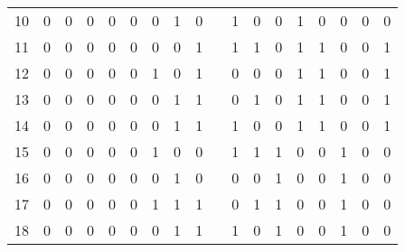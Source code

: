 \begin{table}[H]
\begin{tabular}{|c|c|c|c|c|c|c|c|c|c|c|c|c|c|c|c|c|c|}
		\cline{1-9}\cline{11-18}    10    & 0     & 0     & 0     & 0     & 0     & 0     & 1     & 0     &       & 1     & 0     & 0     & 1     & 0     & 0     & 0     & 0 \bigstrut\\
		\cline{1-9}\cline{11-18}    11    & 0     & 0     & 0     & 0     & 0     & 0     & 0     & 1     &       & 1     & 1     & 0     & 1     & 1     & 0     & 0     & 1 \bigstrut\\
		\cline{1-9}\cline{11-18}    12    & 0     & 0     & 0     & 0     & 0     & 1     & 0     & 1     &       & 0     & 0     & 0     & 1     & 1     & 0     & 0     & 1 \bigstrut\\
		\cline{1-9}\cline{11-18}    13    & 0     & 0     & 0     & 0     & 0     & 0     & 1     & 1     &       & 0     & 1     & 0     & 1     & 1     & 0     & 0     & 1 \bigstrut\\
		\cline{1-9}\cline{11-18}    14    & 0     & 0     & 0     & 0     & 0     & 0     & 1     & 1     &       & 1     & 0     & 0     & 1     & 1     & 0     & 0     & 1 \bigstrut\\
		\cline{1-9}\cline{11-18}    15    & 0     & 0     & 0     & 0     & 0     & 1     & 0     & 0     &       & 1     & 1     & 1     & 0     & 0     & 1     & 0     & 0 \bigstrut\\
		\cline{1-9}\cline{11-18}    16    & 0     & 0     & 0     & 0     & 0     & 0     & 1     & 0     &       & 0     & 0     & 1     & 0     & 0     & 1     & 0     & 0 \bigstrut\\
		\cline{1-9}\cline{11-18}    17    & 0     & 0     & 0     & 0     & 0     & 1     & 1     & 1     &       & 0     & 1     & 1     & 0     & 0     & 1     & 0     & 0 \bigstrut\\
		\cline{1-9}\cline{11-18}    18    & 0     & 0     & 0     & 0     & 0     & 0     & 1     & 1     &       & 1     & 0     & 1     & 0     & 0     & 1     & 0     & 0 \bigstrut\\
		\hline
	\end{tabular}%
\end{table}%

